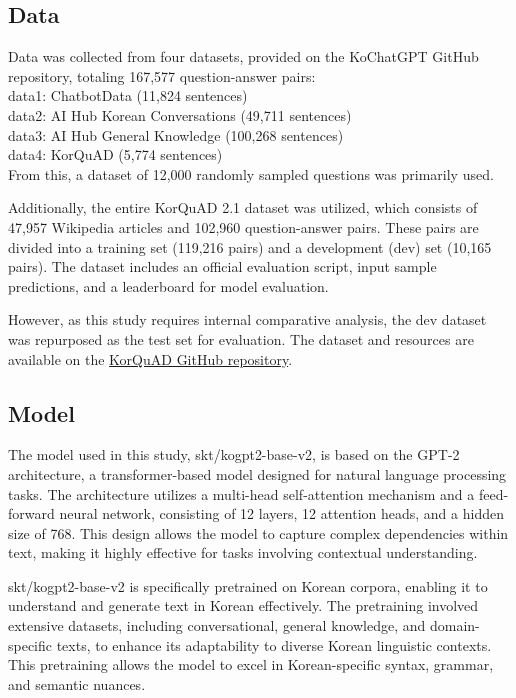 \documentclass[11pt]{article}
\begin{document}
\subsection{Data}
Data was collected from four datasets, provided on the KoChatGPT GitHub repository, totaling 167,577 question-answer pairs:\\
data1: ChatbotData (11,824 sentences)\\
data2: AI Hub Korean Conversations (49,711 sentences)\\
data3: AI Hub General Knowledge (100,268 sentences)\\
data4: KorQuAD (5,774 sentences)\\
From this, a dataset of 12,000 randomly sampled questions was primarily used. 

Additionally, the entire KorQuAD 2.1 dataset was utilized, which consists of 47,957 Wikipedia articles and 102,960 question-answer pairs. These pairs are divided into a training set (119,216 pairs) and a development (dev) set (10,165 pairs). The dataset includes an official evaluation script, input sample predictions, and a leaderboard for model evaluation.

However, as this study requires internal comparative analysis, the dev dataset was repurposed as the test set for evaluation.
The dataset and resources are available on the \href{https://github.com/korquad/korquad.github.io/tree/master/dataset/KorQuAD_2.1}{KorQuAD GitHub repository}.

\subsection{Model}
The model used in this study, skt/kogpt2-base-v2, is based on the GPT-2 architecture, a transformer-based model designed for natural language processing tasks. The architecture utilizes a multi-head self-attention mechanism and a feed-forward neural network, consisting of 12 layers, 12 attention heads, and a hidden size of 768. This design allows the model to capture complex dependencies within text, making it highly effective for tasks involving contextual understanding.

skt/kogpt2-base-v2 is specifically pretrained on Korean corpora, enabling it to understand and generate text in Korean effectively. The pretraining involved extensive datasets, including conversational, general knowledge, and domain-specific texts, to enhance its adaptability to diverse Korean linguistic contexts. This pretraining allows the model to excel in Korean-specific syntax, grammar, and semantic nuances.
\end{document}
